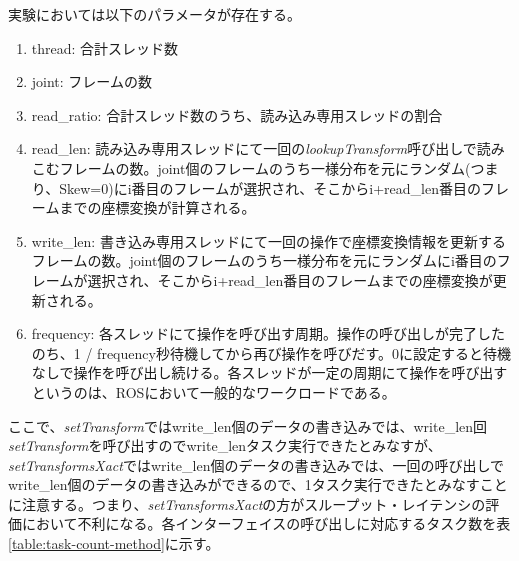 \documentclass[a4paper]{jreport}	%
\begin{document}
実験においては以下のパラメータが存在する。
\begin{enumerate}
  \item thread: 合計スレッド数
  \item joint: フレームの数
  \item read\_ratio: 合計スレッド数のうち、読み込み専用スレッドの割合
  \item read\_len: 読み込み専用スレッドにて一回の\textit{lookupTransform}呼び出しで読みこむフレームの数。joint個のフレームのうち一様分布を元にランダム(つまり、Skew=0)にi番目のフレームが選択され、そこからi+read\_len番目のフレームまでの座標変換が計算される。
  \item write\_len: 書き込み専用スレッドにて一回の操作で座標変換情報を更新するフレームの数。joint個のフレームのうち一様分布を元にランダムにi番目のフレームが選択され、そこからi+read\_len番目のフレームまでの座標変換が更新される。
  \item frequency: 各スレッドにて操作を呼び出す周期。操作の呼び出しが完了したのち、1 / frequency秒待機してから再び操作を呼びだす。0に設定すると待機なしで操作を呼び出し続ける。各スレッドが一定の周期にて操作を呼び出すというのは、ROSにおいて一般的なワークロードである。
\end{enumerate}


ここで、\textit{setTransform}ではwrite\_len個のデータの書き込みでは、write\_len回\textit{setTransform}を呼び出すのでwrite\_lenタスク実行できたとみなすが、\textit{setTransformsXact}ではwrite\_len個のデータの書き込みでは、一回の呼び出しでwrite\_len個のデータの書き込みができるので、1タスク実行できたとみなすことに注意する。つまり、\textit{setTransformsXact}の方がスループット・レイテンシの評価において不利になる。各インターフェイスの呼び出しに対応するタスク数を表\ref{table:task-count-method}に示す。
\end{document}
